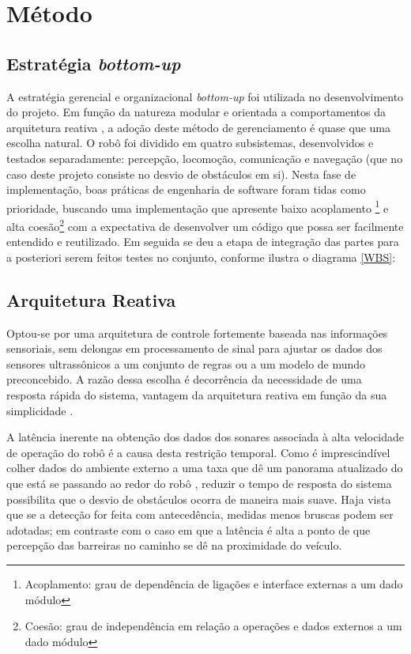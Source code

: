 \chapter{Método}

\section{Estratégia \textit{bottom-up}}
A estratégia gerencial e organizacional \textit{bottom-up} foi utilizada no desenvolvimento do projeto. 
Em função da natureza modular e orientada a comportamentos da arquitetura reativa \cite{murphy}, a adoção deste método de gerenciamento é quase que 
uma escolha natural.
O robô foi dividido em quatro subsistemas, desenvolvidos e testados separadamente: percepção, locomoção, comunicação e navegação (que no caso deste 
projeto consiste no desvio de obstáculos em si). %
Nesta fase de implementação,  boas práticas de engenharia de software foram tidas como prioridade, buscando uma implementação que 
apresente baixo acoplamento \footnote{Acoplamento: grau de dependência de ligações e interface externas a um dado módulo} e alta 
coesão\footnote{Coesão: grau de independência em relação a operações e dados externos a um dado módulo} \cite{murphy} com a expectativa de 
desenvolver um código que possa ser facilmente entendido e reutilizado.
Em seguida se deu a etapa de integração das partes para a posteriori serem feitos testes no conjunto, conforme ilustra o diagrama \ref{WBS}:

\section{Arquitetura Reativa} %
Optou-se por uma arquitetura de controle fortemente baseada nas informações sensoriais, sem delongas em processamento de sinal para ajustar os dados 
dos sensores ultrassônicos a um conjunto de regras ou a um modelo de mundo preconcebido. 
A razão dessa escolha é decorrência da necessidade de uma resposta rápida do sistema, vantagem da arquitetura reativa em função da sua 
simplicidade \cite{roseli}.

A latência inerente na obtenção dos dados dos sonares \cite{jones} associada à alta velocidade de operação do robô é a causa desta restrição 
temporal.
Como é imprescindível colher dados do ambiente externo a uma taxa que dê um panorama atualizado do que está se passando ao redor do robô 
\cite{brooks}, reduzir o tempo de resposta do sistema possibilita que o desvio de obstáculos ocorra de maneira mais suave.
Haja vista que se a detecção for feita com antecedência, medidas menos bruscas podem ser adotadas; em contraste com o caso em que a latência é alta a 
ponto de que percepção das barreiras no caminho se dê na proximidade do veículo.

